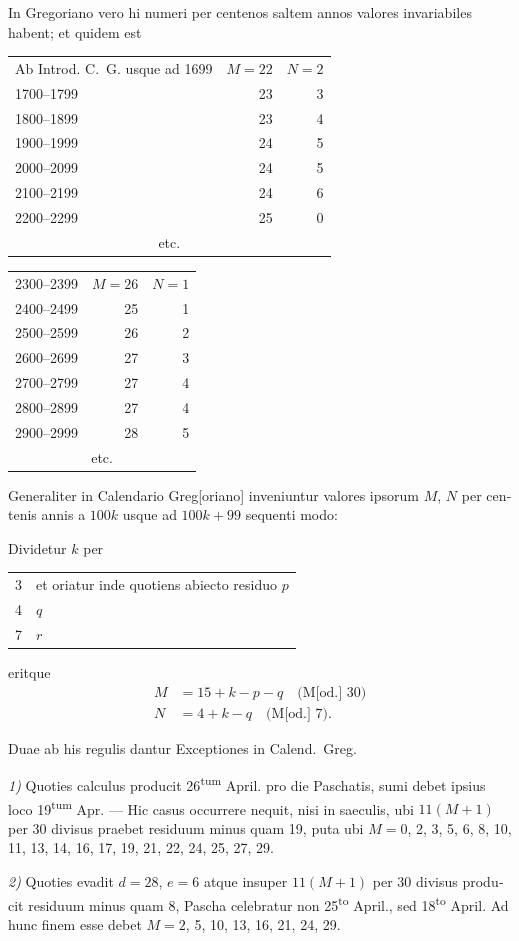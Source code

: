 \documentclass[12pt,a4paper]{article}
\theoremstyle{plain}
\theoremstyle{definition}
\theoremstyle{remark}
\begin{document}
In Gregoriano vero hi numeri per centenos saltem annos valores invariabiles habent; et quidem est

\begin{center}
\begin{tabular}{l@{\quad}r@{\quad}r}
Ab Introd. C.~G. usque ad 1699 & $M = 22$ & $N = 2$ \\
1700--1799 & 23 & 3 \\
1800--1899 & 23 & 4 \\
1900--1999 & 24 & 5 \\
2000--2099 & 24 & 5 \\
2100--2199 & 24 & 6 \\
2200--2299 & 25 & 0 \\
\multicolumn{3}{c}{etc.}
\end{tabular}
\qquad
\begin{tabular}{l@{\quad}r@{\quad}r}
2300--2399 & $M = 26$ & $N = 1$ \\
2400--2499 & 25 & 1 \\
2500--2599 & 26 & 2 \\
2600--2699 & 27 & 3 \\
2700--2799 & 27 & 4 \\
2800--2899 & 27 & 4 \\
2900--2999 & 28 & 5 \\
\multicolumn{3}{c}{etc.}
\end{tabular}
\end{center}

\begin{otherlanguage}{latin}
Generaliter in Calendario Greg[oriano] inveniuntur valores ipsorum $M$, $N$ per centenis annis a $100k$ usque ad $100k + 99$ sequenti modo:

Dividetur $k$ per
\begin{center}
\begin{tabular}{r@{\quad}l}
3 & et oriatur inde quotiens abiecto residuo $p$ \\
4 & \dotfill\quad $q$ \\
7 & \dotfill\quad $r$
\end{tabular}
\end{center}
eritque
\begin{align*}
M &= 15 + k - p - q \quad \text{(M[od.] 30)} \\
N &= 4 + k - q \quad \text{(M[od.] 7).}
\end{align*}

Duae ab his regulis dantur Exceptiones in Calend.~Greg.

\textit{1)} Quoties calculus producit 26\textsuperscript{tum} April. pro die Paschatis, sumi debet ipsius loco 19\textsuperscript{tum} Apr. --- Hic casus occurrere nequit, nisi in saeculis, ubi $11(M + 1)$ per 30 divisus praebet residuum minus quam 19, puta ubi $M = 0$, 2, 3, 5, 6, 8, 10, 11, 13, 14, 16, 17, 19, 21, 22, 24, 25, 27, 29.

\textit{2)} Quoties evadit $d = 28$, $e = 6$ atque insuper $11(M + 1)$ per 30 divisus producit residuum minus quam 8, Pascha celebratur non 25\textsuperscript{to} April., sed 18\textsuperscript{to} April. Ad hunc finem esse debet $M = 2$, 5, 10, 13, 16, 21, 24, 29.
\end{otherlanguage}
\end{document}
